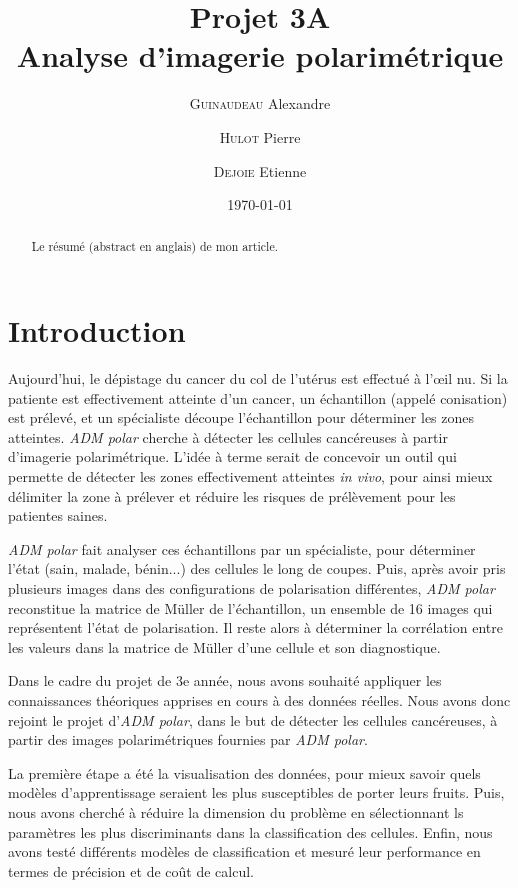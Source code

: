 \documentclass[a4paper,10pt]{report}
\title{Projet 3A\\Analyse d'imagerie polarimétrique}
\author{\textsc{Guinaudeau} Alexandre\\
	\and 
	\textsc{Hulot} Pierre
	\and 
	\textsc{Dejoie} Etienne	
	}
\date{\today}
\begin{document}
\maketitle

\begin{abstract}
Le résumé (abstract en anglais) de mon article.
\end{abstract}

\section*{Introduction}


Aujourd'hui, le dépistage du cancer du col de l'utérus est effectué à l'\oe il nu. Si la patiente est effectivement atteinte d'un cancer, un échantillon (appelé conisation) est prélevé, et un spécialiste découpe l'échantillon pour déterminer les zones atteintes. 
\emph{ADM polar} cherche à détecter les cellules cancéreuses à partir d'imagerie polarimétrique. 
L'idée à terme serait de concevoir un outil qui permette de détecter les zones effectivement atteintes \emph{in vivo}, pour ainsi mieux délimiter la zone à prélever et réduire les risques de prélèvement pour les patientes saines.


\emph{ADM polar} fait analyser ces échantillons par un spécialiste, pour déterminer l'état (sain, malade, bénin...) des cellules le long de coupes.
Puis, après avoir pris plusieurs images dans des configurations de polarisation différentes, \emph{ADM polar} reconstitue la matrice de Müller de l'échantillon, un ensemble de 16 images qui représentent l'état de polarisation.
Il reste alors à déterminer la corrélation entre les valeurs dans la matrice de Müller d'une cellule et son diagnostique.


Dans le cadre du projet de 3e année, nous avons souhaité appliquer les connaissances théoriques apprises en cours à des données réelles. Nous avons donc rejoint le projet d'\emph{ADM polar}, dans le but de détecter les cellules cancéreuses, à partir des images polarimétriques fournies par \emph{ADM polar}.


La première étape a été la visualisation des données, pour mieux savoir quels modèles d'apprentissage seraient les plus susceptibles de porter leurs fruits. Puis, nous avons cherché à réduire la dimension du problème en sélectionnant ls paramètres les plus discriminants dans la classification des cellules. Enfin, nous avons testé différents modèles de classification et mesuré leur performance en termes de précision et de coût de calcul.
\end{document}
